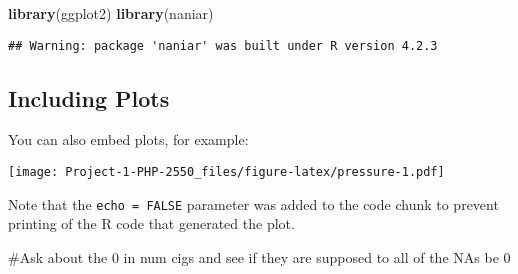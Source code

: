 \documentclass[
]{article}
\newenvironment{Shaded}{\begin{snugshade}}{\end{snugshade}}
\newcommand{\FunctionTok}[1]{\textcolor[rgb]{0.13,0.29,0.53}{\textbf{#1}}}
\newcommand{\NormalTok}[1]{#1}
\begin{document}
\begin{Shaded}
\begin{Highlighting}[]
\FunctionTok{library}\NormalTok{(ggplot2)}
\FunctionTok{library}\NormalTok{(naniar)}
\end{Highlighting}
\end{Shaded}

\begin{verbatim}
## Warning: package 'naniar' was built under R version 4.2.3
\end{verbatim}

\hypertarget{including-plots}{%
\subsection{Including Plots}\label{including-plots}}

You can also embed plots, for example:

\texttt{[image: Project-1-PHP-2550\_files/figure-latex/pressure-1.pdf]}

Note that the \texttt{echo\ =\ FALSE} parameter was added to the code
chunk to prevent printing of the R code that generated the plot.

\#Ask about the 0 in num cigs and see if they are supposed to all of the
NAs be 0
\end{document}
